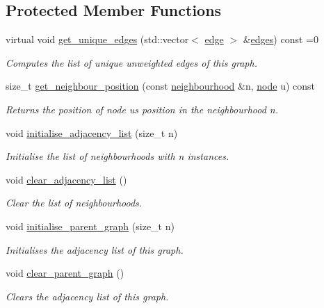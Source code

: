 \subsection*{Protected Member Functions}
\begin{DoxyCompactItemize}
\item 
virtual void \hyperlink{classlgraph_1_1uxgraph_a5a014396ad3bd800028be641c140e5a0}{get\+\_\+unique\+\_\+edges} (std\+::vector$<$ \hyperlink{namespacelgraph_a76bd7d50719f03de7a85db259d80d572}{edge} $>$ \&\hyperlink{classlgraph_1_1uxgraph_abf4c5ce2b595780e6ba80f06bdd0be16}{edges}) const =0
\begin{DoxyCompactList}\small\item\em Computes the list of unique unweighted edges of this graph. \end{DoxyCompactList}\item 
size\+\_\+t \hyperlink{classlgraph_1_1xxgraph_abb0c474cb162940aba3439124c1202d7}{get\+\_\+neighbour\+\_\+position} (const \hyperlink{namespacelgraph_a052e7766c13f3a43cec0aec8173fdede}{neighbourhood} \&n, \hyperlink{namespacelgraph_a397169dd66adf725210a30fb7251773e}{node} u) const
\begin{DoxyCompactList}\small\item\em Returns the position of node {\itshape u\textquotesingle{}s} position in the neighbourhood {\itshape n}. \end{DoxyCompactList}\item 
\mbox{\label{classlgraph_1_1xxgraph_a682d586f850add8b7e637aeea81b0292}} 
void \hyperlink{classlgraph_1_1xxgraph_a682d586f850add8b7e637aeea81b0292}{initialise\+\_\+adjacency\+\_\+list} (size\+\_\+t n)
\begin{DoxyCompactList}\small\item\em Initialise the list of neighbourhoods with {\itshape n} instances. \end{DoxyCompactList}\item 
\mbox{\label{classlgraph_1_1xxgraph_a6b15c62c68919722f7eb18fe273d45fe}} 
void \hyperlink{classlgraph_1_1xxgraph_a6b15c62c68919722f7eb18fe273d45fe}{clear\+\_\+adjacency\+\_\+list} ()
\begin{DoxyCompactList}\small\item\em Clear the list of neighbourhoods. \end{DoxyCompactList}\item 
void \hyperlink{classlgraph_1_1xxgraph_a50c658dd39e6b1d38bf7e514daa2f33c}{initialise\+\_\+parent\+\_\+graph} (size\+\_\+t n)
\begin{DoxyCompactList}\small\item\em Initialises the adjacency list of this graph. \end{DoxyCompactList}\item 
void \hyperlink{classlgraph_1_1xxgraph_a4122495066e4402cbf6d2d9bb82d54cc}{clear\+\_\+parent\+\_\+graph} ()
\begin{DoxyCompactList}\small\item\em Clears the adjacency list of this graph. \end{DoxyCompactList}\end{DoxyCompactItemize}
